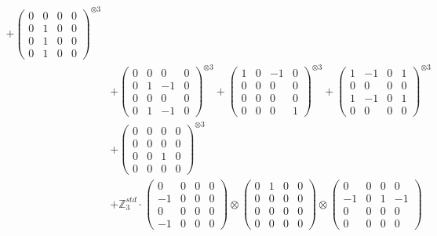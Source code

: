 \documentclass{article}
\begin{document}
{\begin{align}
        + \begin{pmatrix} 0 & 0 & 0 & 0 \\ 0 & 1 & 0 & 0 \\ 0 & 1 & 0 & 0 \\ 0 & 1 & 0 & 0 \end{pmatrix}^{\otimes 3} \\
    &+ \label{Rs12-Rc12-Solution-Transformed-c10} \begin{pmatrix} 0 & 0 & 0 & 0 \\ 0 & 1 & -1 & 0 \\ 0 & 0 & 0 & 0 \\ 0 & 1 & -1 & 0 \end{pmatrix}^{\otimes 3} 
        + \begin{pmatrix} 1 & 0 & -1 & 0 \\ 0 & 0 & 0 & 0 \\ 0 & 0 & 0 & 0 \\ 0 & 0 & 0 & 1 \end{pmatrix}^{\otimes 3} 
        + \begin{pmatrix} 1 & -1 & 0 & 1 \\ 0 & 0 & 0 & 0 \\ 1 & -1 & 0 & 1 \\ 0 & 0 & 0 & 0 \end{pmatrix}^{\otimes 3} \\
    &+ \label{Rs12-Rc12-Solution-Transformed-c13} \begin{pmatrix} 0 & 0 & 0 & 0 \\ 0 & 0 & 0 & 0 \\ 0 & 0 & 1 & 0 \\ 0 & 0 & 0 & 0 \end{pmatrix}^{\otimes 3} \\
    &+ \label{Rs12-Rc12-Solution-Transformed-c14} \mathbb{Z}_3^{std} \cdot 
        \begin{pmatrix} 0 & 0 & 0 & 0 \\ -1 & 0 & 0 & 0 \\ 0 & 0 & 0 & 0 \\ -1 & 0 & 0 & 0 \end{pmatrix} \otimes 
        \begin{pmatrix} 0 & 1 & 0 & 0 \\ 0 & 0 & 0 & 0 \\ 0 & 0 & 0 & 0 \\ 0 & 0 & 0 & 0 \end{pmatrix} \otimes 
        \begin{pmatrix} 0 & 0 & 0 & 0 \\ -1 & 0 & 1 & -1 \\ 0 & 0 & 0 & 0 \\ 0 & 0 & 0 & 0 \end{pmatrix} \\ 

\end{align}}
\end{document}
